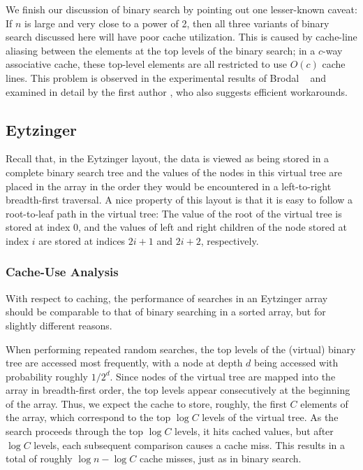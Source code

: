 \documentclass{patmorin}
\begin{document}
We finish our discussion of binary search by pointing out one lesser-known
caveat:  If $n$ is large and very close to a power of 2, then all
three variants of binary search discussed here will have poor cache
utilization.  This is caused by cache-line aliasing between the elements
at the top levels of the binary search; in a $c$-way associative cache,
these top-level elements are all restricted to use $O(c)$ cache lines.
This problem is observed in the experimental results of Brodal \etal\
\cite[Section~4.2]{brodal.fagerberg.ea:cache} and examined in detail
by the first author \cite{khuong:binary}, who also suggests efficient
workarounds.

\subsection{Eytzinger}

Recall that, in the Eytzinger layout, the data is viewed as being
stored in a complete binary search tree and the values of the nodes in
this virtual tree are placed in the array in the order they would be
encountered in a left-to-right breadth-first traversal.  A nice property
of this layout is that it is easy to follow a root-to-leaf path in the
virtual tree: The value of the root of the virtual tree is stored at
index 0, and the values of left and right children of the node stored
at index $i$ are stored at indices $2i+1$ and $2i+2$, respectively.


\subsubsection{Cache-Use Analysis}

With respect to caching, the performance of searches in an Eytzinger
array should be comparable to that of binary searching in a sorted array,
but for slightly different reasons.

When performing repeated random searches, the top levels of the (virtual)
binary tree are accessed most frequently, with a node at depth $d$
being accessed with probability roughly $1/2^d$.  Since nodes of the
virtual tree are mapped into the array in breadth-first order, the
top levels appear consecutively at the beginning of the array. Thus,
we expect the cache to store, roughly, the first $C$ elements of the
array, which correspond to the top $\log C$ levels of the virtual tree.
As the search proceeds through the top $\log C$ levels, it hits cached
values, but after $\log C$ levels, each subsequent comparison causes
a cache miss.  This results in a total of roughly $\log n-\log C$ cache
misses, just as in binary search.
\end{document}
